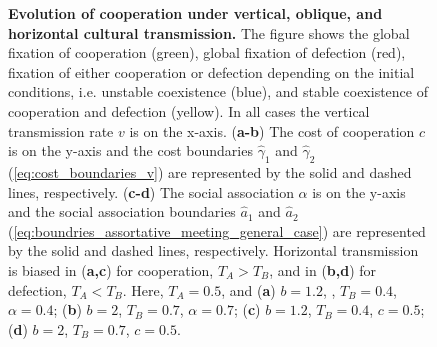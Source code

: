 \documentclass[12pt]{extarticle}
\begin{document}
{\begin{figure}[htb]
    \caption{\textbf{Evolution of cooperation under vertical, oblique, and horizontal cultural transmission.} 
    The figure shows the global fixation of cooperation (green), global fixation of defection (red), fixation of either cooperation or defection depending on the initial conditions, i.e. unstable coexistence (blue), and stable coexistence of cooperation and defection (yellow).
	In all cases the vertical transmission rate $v$ is on the x-axis.
	(\textbf{a-b}) The cost of cooperation $c$ is on the y-axis and the cost boundaries $\hat\gamma_1$ and $\hat\gamma_2$ (\autoref{eq:cost_boundaries_v}) are represented by the solid and dashed lines, respectively. 
    (\textbf{c-d}) The social association $\alpha$ is on the y-axis and the social association boundaries $\hat{a}_1$ and $\hat{a}_2$ (\autoref{eq:boundries_assortative_meeting_general_case}) are represented by the solid and dashed lines, respectively. 
    Horizontal transmission is biased in (\textbf{a,c}) for cooperation, $T_A>T_B$, and in (\textbf{b,d}) for defection, $T_A<T_B$.    
    Here, $T_A = 0.5$, and
    (\textbf{a}) $b=1.2$, , $T_B = 0.4$, $\alpha = 0.4$;
    (\textbf{b}) $b=2$, $T_B = 0.7$, $\alpha = 0.7$;
    (\textbf{c}) $b=1.2$, $T_B = 0.4$, $c=0.5$;
    (\textbf{d}) $b=2$, $T_B = 0.7$, $c=0.5$.
    }
    \label{fig:result3}
\end{figure}
\pagebreak

}
\end{document}
